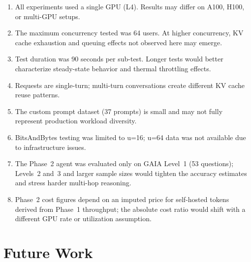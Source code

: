 \documentclass[a4paper,12pt]{report}
\begin{document}
\begin{enumerate}
    \item All experiments used a single GPU (L4). Results may differ on A100, H100, or multi-GPU setups.
    \item The maximum concurrency tested was 64 users. At higher concurrency, KV cache exhaustion and queuing effects not observed here may emerge.
    \item Test duration was 90 seconds per sub-test. Longer tests would better characterize steady-state behavior and thermal throttling effects.
    \item Requests are single-turn; multi-turn conversations create different KV cache reuse patterns.
    \item The custom prompt dataset (37 prompts) is small and may not fully represent production workload diversity.
    \item BitsAndBytes testing was limited to u=16; u=64 data was not available due to infrastructure issues.
    \item The Phase~2 agent was evaluated only on GAIA Level~1 (53 questions); Levels~2 and~3 and larger sample sizes would tighten the accuracy estimates and stress harder multi-hop reasoning.
    \item Phase~2 cost figures depend on an imputed price for self-hosted tokens derived from Phase~1 throughput; the absolute cost ratio would shift with a different GPU rate or utilization assumption.
\end{enumerate}

\section{Future Work}
\end{document}
